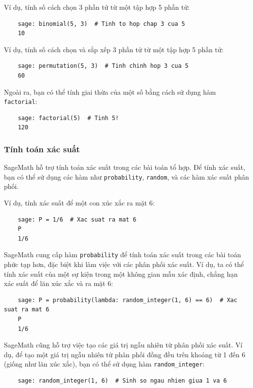 Ví dụ, tính số cách chọn 3 phần tử từ một tập hợp 5 phần tử:

\begin{lstlisting}
	sage: binomial(5, 3)  # Tinh to hop chap 3 cua 5
	10
\end{lstlisting}

Ví dụ, tính số cách chọn và sắp xếp 3 phần tử từ một tập hợp 5 phần tử:
\begin{lstlisting}
	sage: permutation(5, 3)  # Tinh chinh hop 3 cua 5
	60
\end{lstlisting}

Ngoài ra, bạn có thể tính giai thừa của một số bằng cách sử dụng hàm \texttt{factorial}:

\begin{lstlisting}
	sage: factorial(5)  # Tinh 5!
	120
\end{lstlisting}

\subsubsection{Tính toán xác suất}

SageMath hỗ trợ tính toán xác suất trong các bài toán tổ hợp. Để tính xác suất, bạn có thể sử dụng các hàm như \texttt{probability}, \texttt{random}, và các hàm xác suất phân phối.

Ví dụ, tính xác suất để một con xúc xắc ra mặt 6:

\begin{lstlisting}
	sage: P = 1/6  # Xac suat ra mat 6
	P
	1/6
\end{lstlisting}

SageMath cung cấp hàm \texttt{probability} để tính toán xác suất trong các bài toán phức tạp hơn, đặc biệt khi làm việc với các phân phối xác suất. Ví dụ, ta có thể tính xác suất của một sự kiện trong một không gian mẫu xác định, chẳng hạn xác suất để lăn xúc xắc và ra mặt 6:

\begin{lstlisting}
	sage: P = probability(lambda: random_integer(1, 6) == 6)  # Xac suat ra mat 6
	P
	1/6
\end{lstlisting}

SageMath cũng hỗ trợ việc tạo các giá trị ngẫu nhiên từ phân phối xác suất. Ví dụ, để tạo một giá trị ngẫu nhiên từ phân phối đồng đều trên khoảng từ 1 đến 6 (giống như lăn xúc xắc), bạn có thể sử dụng hàm \texttt{random\_integer}:

\begin{lstlisting}
	sage: random_integer(1, 6)  # Sinh so ngau nhien giua 1 va 6
\end{lstlisting}

